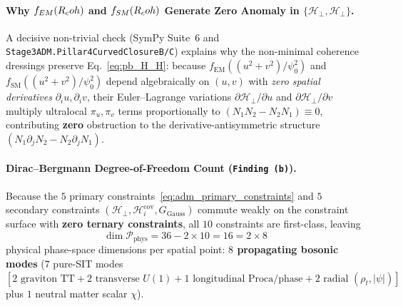 \paragraph{Why $f_{EM}(R_coh)$ and $f_{SM}(R_coh)$ Generate Zero Anomaly in $\{\mathcal{H}_\perp, \mathcal{H}_\perp\}$.}
A decisive non-trivial check (SymPy Suite~6 and \texttt{Stage3\allowbreak{}ADM.\allowbreak{}Pillar4\allowbreak{}Curved\allowbreak{}Closure\allowbreak{}B/C}) explains why the non-minimal coherence dressings preserve Eq.~\eqref{eq:pb_H_H}: because $f_{\mathrm{EM}}((u^2+v^2)/\psi_0^2)$ and $f_{\mathrm{SM}}((u^2+v^2)/\psi_0^2)$ depend algebraically on $(u,v)$ with \emph{zero spatial derivatives} $\partial_i u, \partial_i v$, their Euler--Lagrange variations $\partial\mathcal{H}_\perp/\partial u$ and $\partial\mathcal{H}_\perp/\partial v$ multiply ultralocal $\pi_u, \pi_v$ terms proportionally to $(N_1 N_2 - N_2 N_1) \equiv 0$, contributing \textbf{zero} obstruction to the derivative-antisymmetric structure $(N_1\partial_j N_2 - N_2\partial_j N_1)$.

\paragraph{Dirac--Bergmann Degree-of-Freedom Count (\texttt{Finding (b)}).}
Because the $5$ primary constraints~\eqref{eq:adm_primary_constraints} and $5$ secondary constraints $(\mathcal{H}_\perp, \mathcal{H}_i^{\mathrm{cov}}, G_{\mathrm{Gauss}})$ commute weakly on the constraint surface with \textbf{zero ternary constraints}, all $10$ constraints are first-class, leaving
\begin{equation}
\dim\mathcal{P}_{\mathrm{phys}} = 36 - 2 \times 10 = 16 = 2 \times 8
\label{eq:dirac_bergmann_16_dims}
\end{equation}
physical phase-space dimensions per spatial point: \textbf{$8$ propagating bosonic modes} ($7$ pure-SIT modes $[2\text{ graviton TT} + 2\text{ transverse }U(1) + 1\text{ longitudinal Proca/phase} + 2\text{ radial }(\rho_t,|\psi|)]$ plus $1$ neutral matter scalar $\chi$).

